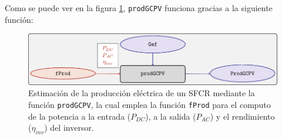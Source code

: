 Como se puede ver en la figura \ref{fig:prodgcpv}, \texttt{prodGCPV} funciona gracias a la siguiente función:
\begin{figure}[htbp]
\centering
\includegraphics[keepaspectratio,width=\textwidth,height=\textheight]{figuras/prodgcpv.pdf}
\caption{Estimación de la producción eléctrica de un SFCR mediante la función \texttt{prodGCPV}, la cual emplea la función \texttt{fProd} para el computo de la potencia a la entrada (\(P_{DC}\)), a la salida (\(P_{AC}\)) y el rendimiento (\(\eta_{inv}\)) del inversor. \label{fig:prodgcpv}}
\end{figure}
